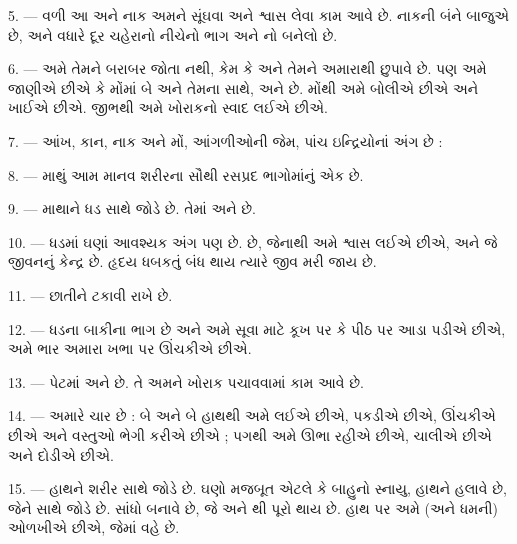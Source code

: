 5. --- વળી આ  અને  નાક અમને સૂંઘવા અને
શ્વાસ લેવા કામ આવે છે. નાકની બંને બાજુએ  છે, અને વધારે
દૂર  ચહેરાનો નીચેનો ભાગ  અને નો
બનેલો છે.

6. --- અમે તેમને બરાબર જોતા નથી, કેમ કે  અને
 તેમને અમારાથી છુપાવે છે. પણ અમે જાણીએ છીએ કે મોંમાં બે
  અને  તેમના
 સાથે, અને  છે. મોંથી અમે બોલીએ છીએ અને
ખાઈએ છીએ. જીભથી અમે ખોરાકનો સ્વાદ લઈએ છીએ.

7. --- આંખ, કાન, નાક અને મોં, આંગળીઓની જેમ, પાંચ ઇન્દ્રિયોનાં અંગ છે :
   

8. --- માથું આમ માનવ શરીરના સૌથી રસપ્રદ ભાગોમાંનું એક છે.

\VUsaut{4.4mm}
\VUsaut{3.0mm}

9. ---  માથાને ધડ સાથે જોડે છે. તેમાં  અને
 છે.

10. --- ધડમાં ઘણાં આવશ્યક અંગ પણ છે.  
છે, જેનાથી અમે શ્વાસ લઈએ છીએ, અને  જે જીવનનું કેન્દ્ર
છે. હૃદય ધબકતું બંધ થાય ત્યારે જીવ મરી જાય છે.

11. ---  છાતીને ટકાવી રાખે છે.

12. --- ધડના બાકીના ભાગ છે   
અને  અમે સૂવા માટે કૂખ પર કે પીઠ પર આડા પડીએ છીએ, અમે
ભાર અમારા ખભા પર ઊંચકીએ છીએ.

13. --- પેટમાં  અને  છે. તે અમને ખોરાક
પચાવવામાં કામ આવે છે.

\VUsaut{4.4mm}
\VUsaut{3.0mm}

14. --- અમારે ચાર  છે : બે  અને બે
 હાથથી અમે લઈએ છીએ, પકડીએ છીએ, ઊંચકીએ છીએ અને વસ્તુઓ ભેગી
કરીએ છીએ ; પગથી અમે ઊભા રહીએ છીએ, ચાલીએ છીએ અને દોડીએ છીએ.

15. ---  હાથને શરીર સાથે જોડે છે. ઘણો મજબૂત
 એટલે કે બાહુનો સ્નાયુ, હાથને હલાવે છે, જેને
  સાથે જોડે છે. 
 સાંધો બનાવે છે, જે  અને થી
પૂરો થાય છે. હાથ પર અમે  (અને ધમની) ઓળખીએ છીએ, જેમાં
 વહે છે.

